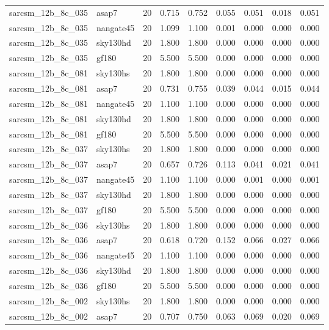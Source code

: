 \begin{tabular}{llrrrrrrr}
sarcsm\_12b\_8c\_035 & asap7 & 20 & 0.715 & 0.752 & 0.055 & 0.051 & 0.018 & 0.051 \\
sarcsm\_12b\_8c\_035 & nangate45 & 20 & 1.099 & 1.100 & 0.001 & 0.000 & 0.000 & 0.000 \\
sarcsm\_12b\_8c\_035 & sky130hd & 20 & 1.800 & 1.800 & 0.000 & 0.000 & 0.000 & 0.000 \\
sarcsm\_12b\_8c\_035 & gf180 & 20 & 5.500 & 5.500 & 0.000 & 0.000 & 0.000 & 0.000 \\
sarcsm\_12b\_8c\_081 & sky130hs & 20 & 1.800 & 1.800 & 0.000 & 0.000 & 0.000 & 0.000 \\
sarcsm\_12b\_8c\_081 & asap7 & 20 & 0.731 & 0.755 & 0.039 & 0.044 & 0.015 & 0.044 \\
sarcsm\_12b\_8c\_081 & nangate45 & 20 & 1.100 & 1.100 & 0.000 & 0.000 & 0.000 & 0.000 \\
sarcsm\_12b\_8c\_081 & sky130hd & 20 & 1.800 & 1.800 & 0.000 & 0.000 & 0.000 & 0.000 \\
sarcsm\_12b\_8c\_081 & gf180 & 20 & 5.500 & 5.500 & 0.000 & 0.000 & 0.000 & 0.000 \\
sarcsm\_12b\_8c\_037 & sky130hs & 20 & 1.800 & 1.800 & 0.000 & 0.000 & 0.000 & 0.000 \\
sarcsm\_12b\_8c\_037 & asap7 & 20 & 0.657 & 0.726 & 0.113 & 0.041 & 0.021 & 0.041 \\
sarcsm\_12b\_8c\_037 & nangate45 & 20 & 1.100 & 1.100 & 0.000 & 0.001 & 0.000 & 0.001 \\
sarcsm\_12b\_8c\_037 & sky130hd & 20 & 1.800 & 1.800 & 0.000 & 0.000 & 0.000 & 0.000 \\
sarcsm\_12b\_8c\_037 & gf180 & 20 & 5.500 & 5.500 & 0.000 & 0.000 & 0.000 & 0.000 \\
sarcsm\_12b\_8c\_036 & sky130hs & 20 & 1.800 & 1.800 & 0.000 & 0.000 & 0.000 & 0.000 \\
sarcsm\_12b\_8c\_036 & asap7 & 20 & 0.618 & 0.720 & 0.152 & 0.066 & 0.027 & 0.066 \\
sarcsm\_12b\_8c\_036 & nangate45 & 20 & 1.100 & 1.100 & 0.000 & 0.000 & 0.000 & 0.000 \\
sarcsm\_12b\_8c\_036 & sky130hd & 20 & 1.800 & 1.800 & 0.000 & 0.000 & 0.000 & 0.000 \\
sarcsm\_12b\_8c\_036 & gf180 & 20 & 5.500 & 5.500 & 0.000 & 0.000 & 0.000 & 0.000 \\
sarcsm\_12b\_8c\_002 & sky130hs & 20 & 1.800 & 1.800 & 0.000 & 0.000 & 0.000 & 0.000 \\
sarcsm\_12b\_8c\_002 & asap7 & 20 & 0.707 & 0.750 & 0.063 & 0.069 & 0.020 & 0.069 \\

\end{tabular}
